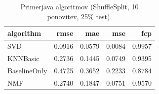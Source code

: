 \begin{table}[h]
\centering
\caption{Primerjava algoritmov (ShuffleSplit, 10 ponovitev, 25\% test).}
\label{tab:algorithm_comparison}
\begin{tabular}{lrrrr}
\toprule
algorithm & rmse & mae & mse & fcp \\
\midrule
SVD & 0.0916 & 0.0579 & 0.0084 & 0.9957 \\
KNNBasic & 0.2736 & 0.1445 & 0.0749 & 0.9395 \\
BaselineOnly & 0.4725 & 0.3652 & 0.2233 & 0.8784 \\
NMF & 0.2740 & 0.1847 & 0.0751 & 0.9570 \\
\bottomrule
\end{tabular}

\end{table}
